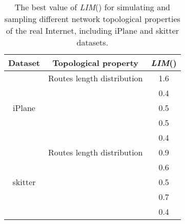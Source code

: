 \documentclass[a4paper]{llncs}
\begin{document}
\begin{table}[!t]
\footnotesize
\caption{The best value of \textit{LIM}() for simulating and sampling different network topological properties of the real Internet, including iPlane and skitter datasets.}
\label{Different alpha for different properties}
\vspace{-1em}
\centering
\setlength{\tabcolsep}{4pt}
\begin{tabular}{c|c||c}
\hline \hline
    Dataset & Topological property & \textit{LIM}() \\
\hline
    & Routes length distribution & 1.6  \\
    \cline{2-3}
           &  & 0.4  \\
    \cline{2-3}
    iPlane &  & 0.5  \\
    \cline{2-3}
           &  & 0.5  \\
    \cline{2-3}
           &  & 0.4  \\
\hline
    & Routes length distribution & 0.9  \\
    \cline{2-3}
           &  & 0.6  \\
    \cline{2-3}
    skitter &  & 0.5  \\
    \cline{2-3}
           &  & 0.7  \\
    \cline{2-3}
           &  & 0.4  \\
\hline \hline
\end{tabular}
\end{table}
\end{document}
